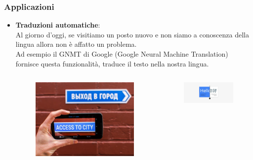 \begin{frame}
	\frametitle{Applicazioni}
		\begin{itemize}
			\item \textbf{Traduzioni automatiche}:\\
				Al giorno d'oggi, se visitiamo un posto nuovo e non siamo a conoscenza della lingua allora non è affatto un problema.\\
				Ad esempio il GNMT di Google (Google Neural Machine Translation) fornisce questa funzionalità, traduce il testo nella nostra lingua.
				
				\begin{columns}
							
					\begin{figure}[!htbp]
						\centering
						\includegraphics[angle=0,width=\linewidth]{images/intro/ml_gtranslate_1.jpeg}
					\end{figure}
								
					\begin{figure}[!htbp]
						\centering
						\includegraphics[angle=0,width=\linewidth]{images/intro/ml_gtranslate_2.jpeg}
					\end{figure}
							
				\end{columns}
			\end{itemize}		
\end{frame}


